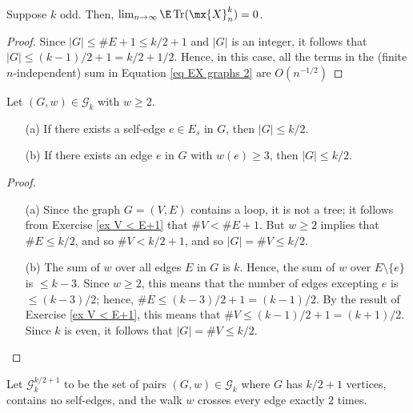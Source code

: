 \begin{proposition}
  \label{prop:odd_case}
  \notready
  Suppose $k$ odd. Then, $\lim_{n\to\infty} \E\Tr(\mx{X}_n^k) = 0$.
\end{proposition}

\begin{proof}
  \notready
  Since $|G|\le \#E+1 \le k/2+1$ and $|G|$ is an integer, it follows that $|G|\le (k-1)/2+1 = k/2 + 1/2$.  Hence, in this case, all the terms in the (finite $n$-independent) sum in Equation \ref{eq EX graphs 2} are $O(n^{-1/2})$
\end{proof}



\begin{proposition}%
  \label{prop:4_4}
  \notready
  Let $(G,w)\in\mathcal{G}_k$ with $w\ge 2$.
  \begin{itemize}
  \item[(a)] If there exists a self-edge $e\in E_s$ in $G$, then $|G|\le k/2$.
  \item[(b)] If there exists an edge $e$ in $G$ with $w(e)\ge 3$, then $|G|\le k/2$.
  \end{itemize}
\end{proposition}

\begin{proof}
  \notready
  \begin{itemize}
    \item[(a)] Since the graph $G = (V,E)$ contains a loop, it is not a tree; it follows from Exercise \ref{ex V < E+1} that $\#V < \#E+1$.  But $w\ge 2$ implies that $\#E\le k/2$, and so $\#V < k/2+1$, and so $|G| = \#V \le k/2$.

    \item[(b)] The sum of $w$ over all edges $E$ in $G$ is $k$.  Hence, the sum of $w$ over $E\setminus\{e\}$ is $\le k-3$.  Since $w\ge 2$, this means that the number of edges excepting $e$ is $\le (k-3)/2$; hence, $\#E \le (k-3)/2+1 = (k-1)/2$.  By the result of Exercise \ref{ex V < E+1}, this means that $\#V \le (k-1)/2+1 = (k+1)/2$.  Since $k$ is even, it follows that $|G|=\#V \le k/2$.
  \end{itemize}
\end{proof}




\begin{def}
  \label{def:special_set_g}
  \notready
  Let $\mathcal{G}^{k/2+1}_k$ to be the set of pairs $(G,w)\in\mathcal{G}_k$ where $G$ has $k/2+1$ vertices, contains no self-edges, and the walk $w$ crosses every edge exactly $2$ times.
\end{def}



